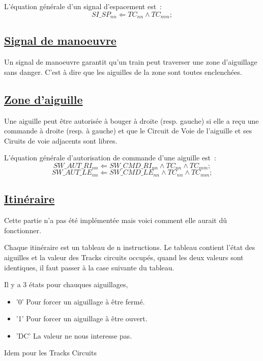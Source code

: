 \medskip
L'équation générale d'un signal d'espacement est~:
$$\boxed{
  SI\_SP_{nn} \Leftarrow TC_{nn} \land TC_{mm};
}$$


\subsection{\underline{Signal de manoeuvre}}
\label{sec:esp}

Un signal de manoeuvre garantit qu'un train peut traverser une zone
d'aiguillage sans danger. C'est à dire que les aiguilles de la zone
sont toutes enclenchées.




\subsection{\underline{Zone d'aiguille}}
\label{sec:aig}

Une aiguille peut être autorisée à bouger à droite (resp. gauche) 
si elle a reçu une commande à droite (resp. à gauche) et que le 
Circuit de Voie de l'aiguille et ses Ciruits de voie adjacents
sont libres. 

\medskip
L'équation générale d'autorisation de commande d'une aiguille est~:
$$\boxed{
  SW\_AUT\_RI_{nn} \Leftarrow SW\_CMD\_RI_{nn} \land TC_{nn} \land
  TC_{mm} ;
}$$
$$\boxed{
  SW\_AUT\_LE_{nn} \Leftarrow SW\_CMD\_LE_{nn} \land TC_{nn} \land TC_{mm} ;
}$$


\subsection{\underline{Itinéraire}}
\label{sec:iti}

Cette partie n'a pas été implémentée mais voici comment elle aurait dû
fonctionner.

Chaque itinéraire est un tableau de n instructions.
Le tableau contient l’état des aiguilles et la valeur des Tracks
circuits  occupés, quand les deux  valeurs sont identiques, il faut
passer  à la case suivante du  tableau.

Il y a 3 états pour chauques aiguillages,
\begin{itemize}
  \item '0' Pour forcer un aiguillage à être fermé.
  \item '1' Pour forcer un aiguillage à être ouvert.
  \item 'DC' La valeur ne nous interesse pas.    
\end{itemize}  

Idem pour les Tracks Circuits

